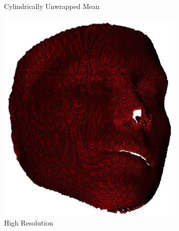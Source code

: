 \begin{figure}
\begin{subfigure}[b]{0.23\textheight}
        \caption{Cylindrically Unwrapped Mean}\label{subfig:face_flow_cylin_unwrap}
    \end{subfigure} \hfill
    \begin{subfigure}[b]{0.135\textheight}
        \centering
        \includegraphics[width=\textwidth]{face_flow/images/contour_snapping/example_instance_high}
        \caption{High Resolution}\label{subfig:face_flow_instance_high}
    \end{subfigure} \hfill
    \begin{subfigure}[b]{0.13\textheight}
        \centering

\end{subfigure}
\end{figure}
